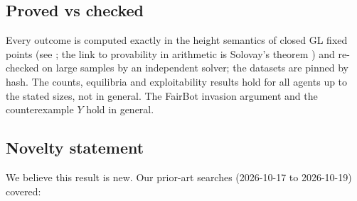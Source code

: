 \documentclass{article}
\begin{document}
\subsection*{Proved vs checked}

Every outcome is computed exactly in the height semantics of closed GL fixed points (see
\cite{boolos1993logic}; the link to provability in arithmetic is Solovay's theorem
\cite{solovay1976provability}) and re-checked on large samples by an independent solver; the
datasets are pinned by hash. The counts, equilibria and exploitability results hold for all
agents up to the stated sizes, not in general. The FairBot invasion argument and the
counterexample $Y$ hold in general.

\subsection*{Novelty statement}

We believe this result is new. Our prior-art searches (2026-10-17 to 2026-10-19) covered:
\end{document}
